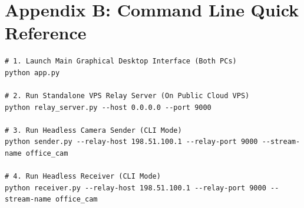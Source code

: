 \documentclass[11pt,a4paper]{article}
\begin{document}
\section{Appendix B: Command Line Quick Reference}

\begin{lstlisting}[caption={Execution reference commands for CLI deployment}]
# 1. Launch Main Graphical Desktop Interface (Both PCs)
python app.py

# 2. Run Standalone VPS Relay Server (On Public Cloud VPS)
python relay_server.py --host 0.0.0.0 --port 9000

# 3. Run Headless Camera Sender (CLI Mode)
python sender.py --relay-host 198.51.100.1 --relay-port 9000 --stream-name office_cam

# 4. Run Headless Receiver (CLI Mode)
python receiver.py --relay-host 198.51.100.1 --relay-port 9000 --stream-name office_cam
\end{lstlisting}
\end{document}
